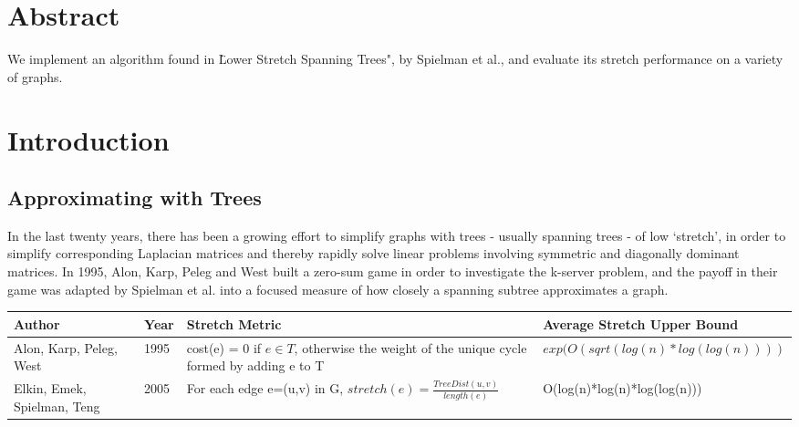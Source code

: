 \documentclass{article}
\title{\cTitle}
\author{\cAuthor}
\begin{document}
\maketitle

\section*{Abstract}
We implement an algorithm found in \"Lower Stretch Spanning Trees", by Spielman et al., and evaluate its stretch performance on a variety of graphs.
\section*{Introduction}
\subsection*{Approximating with Trees}
In the last twenty years, there has been a growing effort to simplify graphs with trees - usually spanning trees - of low `stretch', in order to simplify corresponding Laplacian matrices and thereby rapidly solve linear problems involving symmetric and diagonally dominant matrices.
In 1995, Alon, Karp, Peleg and West\cite{akpw:game} built a zero-sum game in order to investigate the k-server problem\cite{wiki:kserver}, and the payoff in their game was adapted by Spielman et al.\cite{spielman:lower-stretch} into a focused measure of how closely a spanning subtree approximates a graph.

\begin{table}
    \begin{tabular}{|p{3cm}|l|p{5cm}|l|}
    \hline
    Author                      &         Year &                Stretch Metric                                                                              & Average Stretch Upper Bound                             \\ \hline
    Alon, Karp, Peleg, West     & 1995 &           cost(e) = 0 if $e \in T$, otherwise the weight of the unique cycle formed by adding e to T  &                         $exp(O(sqrt(log(n)*log(log(n))))$ \\ \hline
    Elkin, Emek, Spielman, Teng & 2005 & For each edge e=(u,v) in G, $stretch(e) = \frac{TreeDist(u,v)}{length(e)}$                            & O(log(n)*log(n)*log(log(n)))                            \\ \hline
    \end{tabular}
\end{table}
\end{document}
